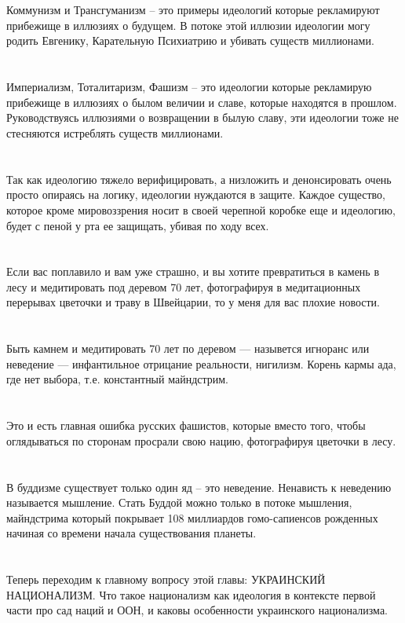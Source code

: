 \\
\\
Коммунизм и Трансгуманизм -- это примеры идеологий которые рекламируют прибежище в иллюзиях о будущем. В потоке этой иллюзии идеологии могу родить Евгенику, Карательную Психиатрию и убивать существ миллионами.\\
\\
\\
Империализм, Тоталитаризм, Фашизм -- это идеологии которые рекламирую прибежище в иллюзиях о былом величии и славе, которые находятся в прошлом. Руководствуясь иллюзиями о возвращении в былую славу, эти идеологии тоже не стесняются истреблять существ миллионами.\\
\\
\\
Так как идеологию тяжело верифицировать, а низложить и денонсировать очень просто опираясь на логику, идеологии нуждаются в защите. Каждое существо, которое кроме мировоззрения носит в своей черепной коробке еще и идеологию, будет с пеной у рта ее защищать, убивая по ходу всех.\\
\\
\\
Если вас поплавило и вам уже страшно, и вы хотите превратиться в камень в лесу и медитировать под деревом 70 лет, фотографируя в медитационных перерывах цветочки и траву в Швейцарии, то у меня для вас плохие новости.\\
\\
\\
Быть камнем и медитировать 70 лет по деревом — назывется игноранс или неведение — инфантильное отрицание реальности, нигилизм. Корень кармы ада, где нет выбора, т.е. константный майндстрим.\\
\\
\\
Это и есть главная ошибка русских фашистов, которые вместо того, чтобы оглядываться по сторонам просрали свою нацию, фотографируя цветочки в лесу.\\
\\
\\
В буддизме существует только один яд -- это неведение. Ненависть к неведению называется мышление. Стать Буддой можно только в потоке мышления, майндстрима который покрывает 108 миллиардов гомо-сапиенсов рожденных начиная со времени начала существования планеты.\\
\\
\\
Теперь переходим к главному вопросу этой главы: УКРАИНСКИЙ НАЦИОНАЛИЗМ. Что такое национализм как идеология в контексте первой части про сад наций и ООН, и каковы особенности украинского национализма.\\
